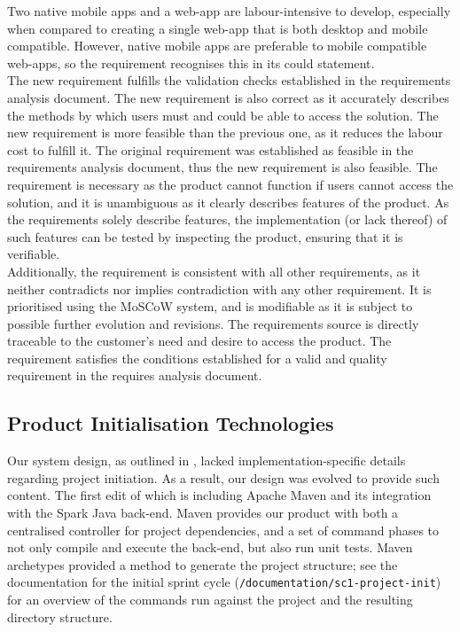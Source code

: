 \documentclass[9pt, titlepage]{extarticle}
\begin{document}
Two native mobile apps and a web-app are labour-intensive to develop, especially when compared to creating a single web-app that is both desktop and mobile compatible. However, native mobile apps are preferable to mobile compatible web-apps, so the requirement recognises this in its could statement.\\

The new requirement fulfills the validation checks established in the requirements analysis document. The new requirement is also correct as it accurately describes the methods by which users must and could be able to access the solution. The new requirement is more feasible than the previous one, as it reduces the labour cost to fulfill it. The original requirement was established as feasible in the requirements analysis document, thus the new requirement is also feasible. The requirement is necessary as the product cannot function if users cannot access the solution, and it is unambiguous as it clearly describes features of the product. As the requirements solely describe features, the implementation (or lack thereof) of such features can be tested by inspecting the product, ensuring that it is verifiable.\\

Additionally, the requirement is consistent with all other requirements, as it neither contradicts nor implies contradiction with any other requirement. It is prioritised using the MoSCoW system, and is modifiable as it is subject to possible further evolution and revisions. The requirements source is directly traceable to the customer's need and desire to access the product. The requirement satisfies the conditions established for a valid and quality requirement in the requires analysis document.

\subsection{Product Initialisation Technologies}

Our system design, as outlined in \cite{design-and-planning}, lacked implementation-specific details regarding project initiation. As a result, our design was evolved to provide such content. The first edit of which is including Apache Maven \cite{maven} and its integration with the Spark Java \cite{web:spark} back-end. Maven provides our product with both a centralised controller for project dependencies, and a set of command phases to not only compile and execute the back-end, but also run unit tests. Maven archetypes provided a method to generate the project structure; see the documentation for the initial sprint cycle (\texttt{/documentation/sc1-project-init}) for an overview of the commands run against the project and the resulting directory structure.
\end{document}
